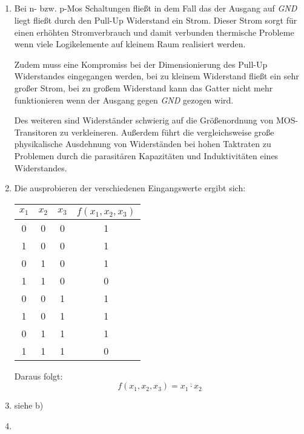 \documentclass[DIN, pagenumber=false, fontsize=11pt, parskip=half]{scrartcl}
\begin{document}
    \subsection{}
    \begin{enumerate}[label = (\alph*)]
        \item Bei n- bzw. p-Mos Schaltungen fließt in dem Fall das der Ausgang auf
            \textit{GND} liegt fließt durch den Pull-Up Widerstand ein Strom.
            Dieser Strom sorgt für einen erhöhten Stromverbrauch und damit verbunden
            thermische Probleme wenn viele Logikelemente auf kleinem Raum realisiert werden.

            Zudem muss eine Kompromiss bei der Dimensionierung des Pull-Up Widerstandes
            eingegangen werden, bei zu kleinem Widerstand fließt ein sehr großer Strom,
            bei zu großem Widerstand kann das Gatter nicht mehr funktionieren wenn
            der Ausgang gegen \textit{GND} gezogen wird.

            Des weiteren sind Widerständer schwierig auf die Größenordnung von MOS-Transitoren
            zu verkleineren. Außerdem führt die vergleichsweise große physikalische Ausdehnung
            von Widerständen bei hohen Taktraten zu Problemen durch die parasitären
            Kapazitäten und Induktivitäten eines Widerstandes.
        \item
            Die ausprobieren der verschiedenen Eingangswerte ergibt sich:
            \begin{table}[H]
                \centering
                \begin{tabular}{ccc|c}
                    \toprule
                    $x_1$ & $x_2$ & $x_3$ & $f(x_1, x_2, x_3)$ \\
                    \midrule
                    0 & 0 & 0 & 1 \\
                    1 & 0 & 0 & 1 \\
                    0 & 1 & 0 & 1 \\
                    1 & 1 & 0 & 0 \\
                    0 & 0 & 1 & 1 \\
                    1 & 0 & 1 & 1 \\
                    0 & 1 & 1 & 1 \\
                    1 & 1 & 1 & 0 \\
                    \bottomrule
                \end{tabular}
            \end{table}
            Daraus folgt:
            \begin{equation*}
                f(x_1, x_2, x_3) = \overline{x_1 \cdot x_2}
            \end{equation*}
        \item siehe b)
        \item %
    \end{enumerate}
\end{document}
